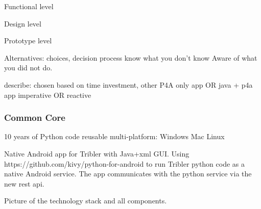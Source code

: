 Functional level

Design level

Prototype level



Alternatives: choices, decision process
know what you don't know
Aware of what you did not do.


describe: chosen based on time investment, other 
P4A only app OR java + p4a app
imperative OR reactive



\subsubsection{Common Core}
10 years of Python code 
reusable multi-platform: Windows Mac Linux


Native Android app for Tribler with Java+xml GUI.
Using https://github.com/kivy/python-for-android to run Tribler python code as a native Android service.
The app communicates with the python service via the new rest api.

Picture of the technology stack and all components.
